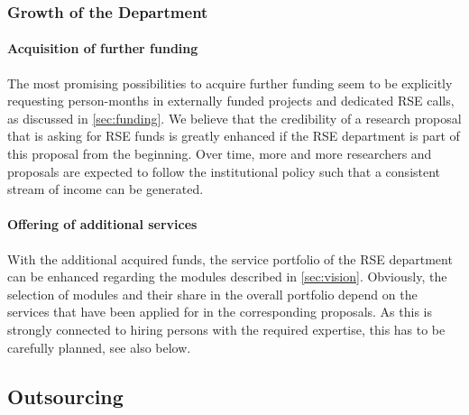\documentclass[a4paper]{article}
\begin{document}
\subsubsection{Growth of the Department}

\paragraph{Acquisition of further funding}
The most promising possibilities to acquire further funding seem to be explicitly requesting person-months in externally funded projects and dedicated RSE calls, as discussed in \autoref{sec:funding}.
We believe that the credibility of a research proposal that is asking for RSE funds is greatly enhanced if the RSE department is part of this proposal from the beginning.
Over time, more and more researchers and proposals are expected to follow the institutional policy such that a consistent stream of income can be generated.

\paragraph{Offering of additional services}
With the additional acquired funds, the service portfolio of the RSE department can be enhanced regarding the modules described in \autoref{sec:vision}.
Obviously, the selection of modules and their share in the overall portfolio depend on the services that have been applied for in the corresponding proposals.
As this is strongly connected to hiring persons with the required expertise, this has to be carefully planned, see also below.


\subsection{Outsourcing}
\end{document}
